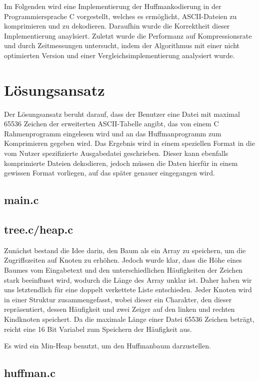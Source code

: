 \documentclass[course=erap]{aspdoc}
\begin{document}
Im Folgenden wird eine Implementierung der Huffmankodierung in der Programmiersprache C vorgestellt, welches es ermöglicht, ASCII-Dateien
zu komprimieren und zu dekodieren. Daraufhin wurde die Korrektheit  %
dieser Implementierung anaylsiert. Zuletzt wurde die Performanz auf Kompressionsrate und durch Zeitmessungen untersucht, indem der Algorithmus mit einer nicht optimierten Version und einer Vergleichsimplementierung analysiert wurde.

\section{Lösungsansatz}

Der Lösungsansatz beruht darauf, dass der Benutzer eine Datei mit maximal 65536 Zeichen der erweiterten ASCII-Tabelle angibt, das von einem C Rahmenprogramm eingelesen wird und an das Huffmanprogramm zum Komprimieren gegeben wird. Das Ergebnis wird in einem speziellen Format in die vom Nutzer spezifizierte Ausgabedatei geschrieben. Dieser kann ebenfalls komprimierte Dateien dekodieren, jedoch müssen die Daten hierfür in einem gewissen Format vorliegen, auf das später %
genauer eingegangen wird.

\subsection{main.c}
\subsection{tree.c/heap.c}

Zunächst bestand die Idee darin, den Baum als ein Array zu speichern, um die Zugriffszeiten auf Knoten zu erhöhen. Jedoch wurde klar, dass die Höhe eines Baumes vom Eingabetext und den unterschiedlichen Häufigkeiten der Zeichen stark beeinflusst wird, wodurch die Länge des Array unklar ist. Daher haben wir uns letztendlich für eine doppelt verkettete Liste entschieden. Jeder Knoten wird in einer Struktur zusammengefasst, wobei dieser ein Charakter, den dieser repräsentiert, dessen Häufigkeit und zwei Zeiger auf den linken und rechten Kindknoten speichert. Da die maximale Länge einer Datei 65536 Zeichen beträgt, reicht eine 16 Bit Variabel zum Speichern der Häufigkeit aus.

Es wird ein Min-Heap benutzt, um den Huffmanbaum darzustellen.



\subsection{huffman.c}
\end{document}
